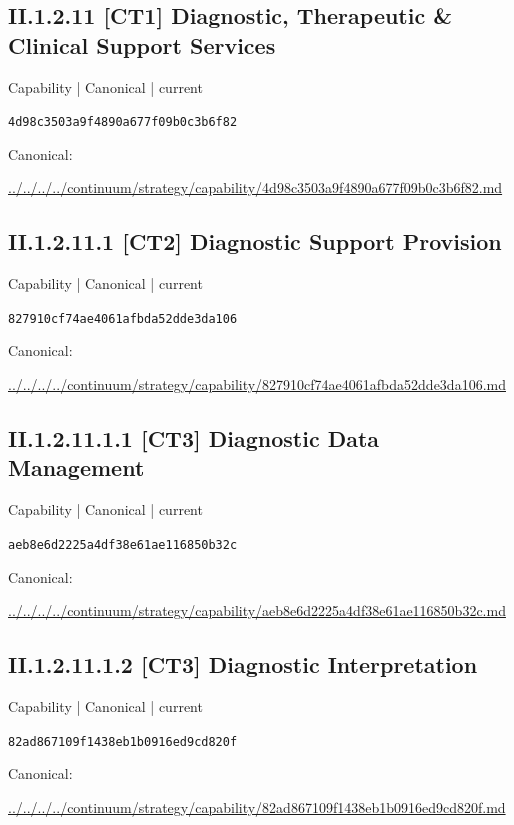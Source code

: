 \documentclass[10pt,a4paper]{article}
\begin{document}
\subsection*{II.1.2.11 [CT1] Diagnostic, Therapeutic \& Clinical Support Services}
{\small Capability | Canonical | current}\par
\texttt{4d98c3503a9f4890a677f09b0c3b6f82}\par
Canonical: \par
{\footnotesize\url{../../../../continuum/strategy/capability/4d98c3503a9f4890a677f09b0c3b6f82.md}}\par
\subsection*{II.1.2.11.1 [CT2] Diagnostic Support Provision}
{\small Capability | Canonical | current}\par
\texttt{827910cf74ae4061afbda52dde3da106}\par
Canonical: \par
{\footnotesize\url{../../../../continuum/strategy/capability/827910cf74ae4061afbda52dde3da106.md}}\par
\subsection*{II.1.2.11.1.1 [CT3] Diagnostic Data Management}
{\small Capability | Canonical | current}\par
\texttt{aeb8e6d2225a4df38e61ae116850b32c}\par
Canonical: \par
{\footnotesize\url{../../../../continuum/strategy/capability/aeb8e6d2225a4df38e61ae116850b32c.md}}\par
\subsection*{II.1.2.11.1.2 [CT3] Diagnostic Interpretation}
{\small Capability | Canonical | current}\par
\texttt{82ad867109f1438eb1b0916ed9cd820f}\par
Canonical: \par
{\footnotesize\url{../../../../continuum/strategy/capability/82ad867109f1438eb1b0916ed9cd820f.md}}\par
\end{document}
